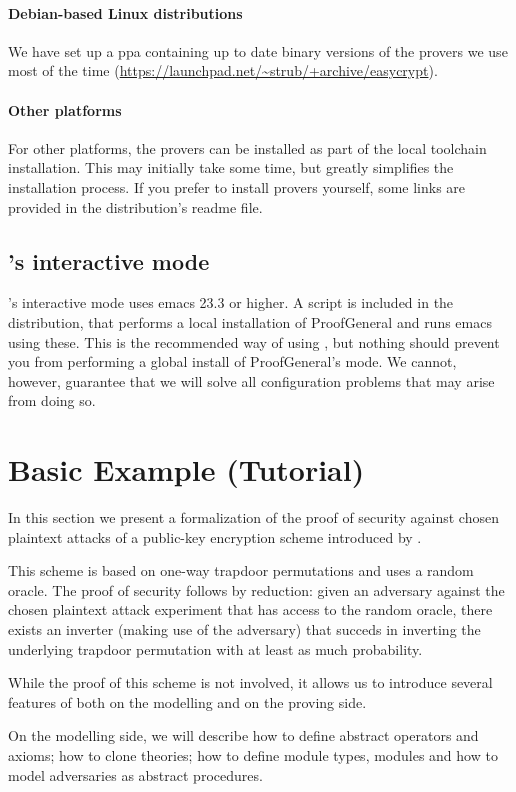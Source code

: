 \paragraph{Debian-based Linux distributions}
We have set up a ppa containing up to date binary versions of the provers we
use most of the time (\url{https://launchpad.net/~strub/+archive/easycrypt}).

\paragraph{Other platforms}
For other platforms, the provers can be installed as part of the local toolchain
installation. This may initially take some time, but greatly simplifies the
installation process. If you prefer to install provers yourself, some links are
provided in the distribution's readme file.

\subsection{\EC's interactive mode}
\EC's interactive mode uses emacs 23.3 or higher. A script is included in the
distribution, that performs a local installation of ProofGeneral and runs emacs
using these. This is the recommended way of using \EC, but nothing should
prevent you from performing a global install of ProofGeneral's \EC mode. We
cannot, however, guarantee that we will solve all configuration problems that
may arise from doing so.

\section{Basic Example (Tutorial)\label{sec:tutorial}}
In this section we present a formalization of the proof of security
against chosen plaintext attacks of a public-key encryption scheme
introduced by \citet{br93}.

This scheme is based on one-way trapdoor permutations and uses a
random oracle. The proof of security follows by reduction: given an
adversary against the chosen plaintext attack experiment that has
access to the random oracle, there exists an inverter (making use of
the adversary) that succeds in inverting the underlying trapdoor
permutation with at least as much probability.

While the proof of this scheme is not involved, it allows us to
introduce several features of \EC both on the modelling and on
the proving side.

On the modelling side, we will describe how to define abstract operators
and axioms; how to clone theories; how to define module types, modules
and how to model adversaries as abstract procedures.

